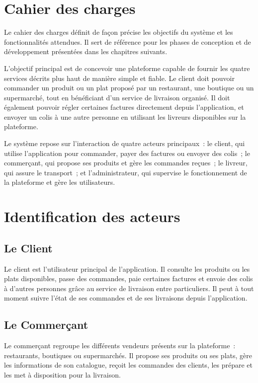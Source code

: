 \documentclass[12pt,fleqn,a4paper]{report}
\begin{document}
\begin{justify}
\section{Cahier des charges}

Le cahier des charges définit de façon précise les objectifs du système et les fonctionnalités attendues. Il sert de référence pour les phases de conception et de développement présentées dans les chapitres suivants.

L'objectif principal est de concevoir une plateforme capable de fournir les quatre services décrits plus haut de manière simple et fiable. Le client doit pouvoir commander un produit ou un plat proposé par un restaurant, une boutique ou un supermarché, tout en bénéficiant d'un service de livraison organisé. Il doit également pouvoir régler certaines factures directement depuis l'application, et envoyer un colis à une autre personne en utilisant les livreurs disponibles sur la plateforme.

Le système repose sur l'interaction de quatre acteurs principaux~: le client, qui utilise l'application pour commander, payer des factures ou envoyer des colis~; le commerçant, qui propose ses produits et gère les commandes reçues~; le livreur, qui assure le transport~; et l'administrateur, qui supervise le fonctionnement de la plateforme et gère les utilisateurs.

\section{Identification des acteurs}

\subsection{Le Client}
Le client est l'utilisateur principal de l'application. Il consulte les produits ou les plats disponibles, passe des commandes, paie certaines factures et envoie des colis à d'autres personnes grâce au service de livraison entre particuliers. Il peut à tout moment suivre l'état de ses commandes et de ses livraisons depuis l'application.

\subsection{Le Commerçant}
Le commerçant regroupe les différents vendeurs présents sur la plateforme~: restaurants, boutiques ou supermarchés. Il propose ses produits ou ses plats, gère les informations de son catalogue, reçoit les commandes des clients, les prépare et les met à disposition pour la livraison.


\end{justify}
\end{document}
